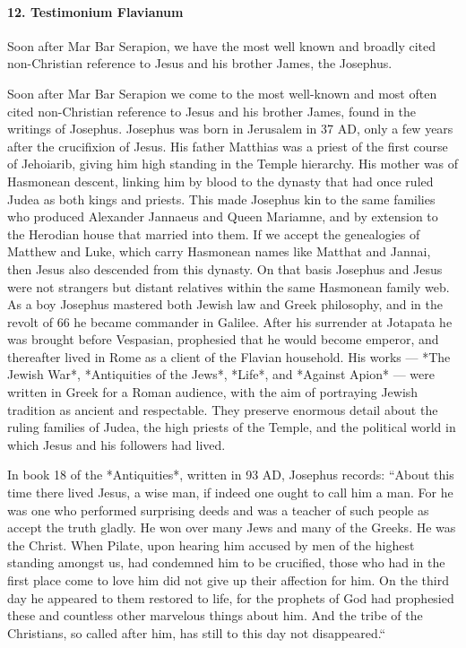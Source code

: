 \paragraph{12.
Testimonium Flavianum}\label{par:testimonium-flavianum}

Soon after Mar Bar Serapion, we have the most well known and broadly cited non-Christian reference to Jesus and his brother James, the Josephus.

Soon after Mar Bar Serapion we come to the most well-known and most often cited non-Christian reference to Jesus and his brother James, found in the writings of Josephus.
Josephus was born in Jerusalem in 37 AD, only a few years after the crucifixion of Jesus.
His father Matthias was a priest of the first course of Jehoiarib, giving him high standing in the Temple hierarchy.
His mother was of Hasmonean descent, linking him by blood to the dynasty that had once ruled Judea as both kings and priests.
This made Josephus kin to the same families who produced Alexander Jannaeus and Queen Mariamne, and by extension to the Herodian house that married into them.
If we accept the genealogies of Matthew and Luke, which carry Hasmonean names like Matthat and Jannai, then Jesus also descended from this dynasty.
On that basis Josephus and Jesus were not strangers but distant relatives within the same Hasmonean family web.
As a boy Josephus mastered both Jewish law and Greek philosophy, and in the revolt of 66 he became commander in Galilee.
After his surrender at Jotapata he was brought before Vespasian, prophesied that he would become emperor, and thereafter lived in Rome as a client of the Flavian household.
His works — *The Jewish War*, *Antiquities of the Jews*, *Life*, and *Against Apion* — were written in Greek for a Roman audience, with the aim of portraying Jewish tradition as ancient and respectable.
They preserve enormous detail about the ruling families of Judea, the high priests of the Temple, and the political world in which Jesus and his followers had lived.

In book 18 of the *Antiquities*, written in 93 AD, Josephus records:
``About this time there lived Jesus, a wise man, if indeed one ought to call him a man.
For he was one who performed surprising deeds and was a teacher of such people as accept the truth gladly.
He won over many Jews and many of the Greeks.
He was the Christ.
When Pilate, upon hearing him accused by men of the highest standing amongst us, had condemned him to be crucified, those who had in the first place come to love him did not give up their affection for him.
On the third day he appeared to them restored to life, for the prophets of God had prophesied these and countless other marvelous things about him.
And the tribe of the Christians, so called after him, has still to this day not disappeared.``

